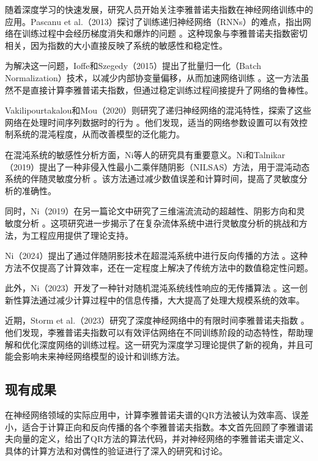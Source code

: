 \documentclass[12pt,a4paper]{amsart}
\begin{document}
随着深度学习的快速发展，研究人员开始关注李雅普诺夫指数在神经网络训练中的应用。Pascanu et al.（2013）探讨了训练递归神经网络（RNNs）的难点，指出网络在训练过程中会经历梯度消失和爆炸的问题 \cite{pascanu2013difficulty}。这种现象与李雅普诺夫指数密切相关，因为指数的大小直接反映了系统的敏感性和稳定性。

为解决这一问题，Ioffe和Szegedy（2015）提出了批量归一化（Batch Normalization）技术，以减少内部协变量偏移，从而加速网络训练 \cite{ioffe2015batch}。这一方法虽然不是直接计算李雅普诺夫指数，但通过稳定训练过程间接提升了网络的鲁棒性。

Vakilipourtakalou和Mou（2020）则研究了递归神经网络的混沌特性，探索了这些网络在处理时间序列数据时的行为 \cite{vakilipourtakalou2020chaotic}。他们发现，适当的网络参数设置可以有效控制系统的混沌程度，从而改善模型的泛化能力。

在混沌系统的敏感性分析方面，Ni等人的研究具有重要意义。Ni和Talnikar（2019）提出了一种非侵入性最小二乘伴随阴影（NILSAS）方法，用于混沌动态系统的伴随灵敏度分析 \cite{Ni20191}。该方法通过减少数值误差和计算时间，提高了灵敏度分析的准确性。

同时，Ni（2019）在另一篇论文中研究了三维湍流流动的超越性、阴影方向和灵敏度分析 \cite{Ni20192}。这项研究进一步揭示了在复杂流体系统中进行灵敏度分析的挑战和方法，为工程应用提供了理论支持。

Ni（2024）提出了通过伴随阴影技术在超混沌系统中进行反向传播的方法 \cite{ni2024backpropagation}。这种方法不仅提高了计算效率，还在一定程度上解决了传统方法中的数值稳定性问题。

此外，Ni（2023）开发了一种针对随机混沌系统线性响应的无传播算法 \cite{ni2023nopropagate}。这一创新性算法通过减少计算过程中的信息传播，大大提高了处理大规模系统的效率。

近期，Storm et al.（2023）研究了深度神经网络中的有限时间李雅普诺夫指数 \cite{storm2023finitetime}。他们发现，李雅普诺夫指数可以有效评估网络在不同训练阶段的动态特性，帮助理解和优化深度网络的训练过程。这一研究为深度学习理论提供了新的视角，并且可能会影响未来神经网络模型的设计和训练方法。

\subsection{现有成果}

在神经网络领域的实际应用中，计算李雅普诺夫谱的QR方法被认为效率高、误差小，适合于计算正向和反向传播的各个李雅普诺夫指数。本文首先回顾了李雅谱诺夫向量的定义，给出了QR方法的算法代码，并对神经网络的李雅普诺夫谱定义、具体的计算方法和对偶性的验证进行了深入的研究和讨论。
\end{document}
